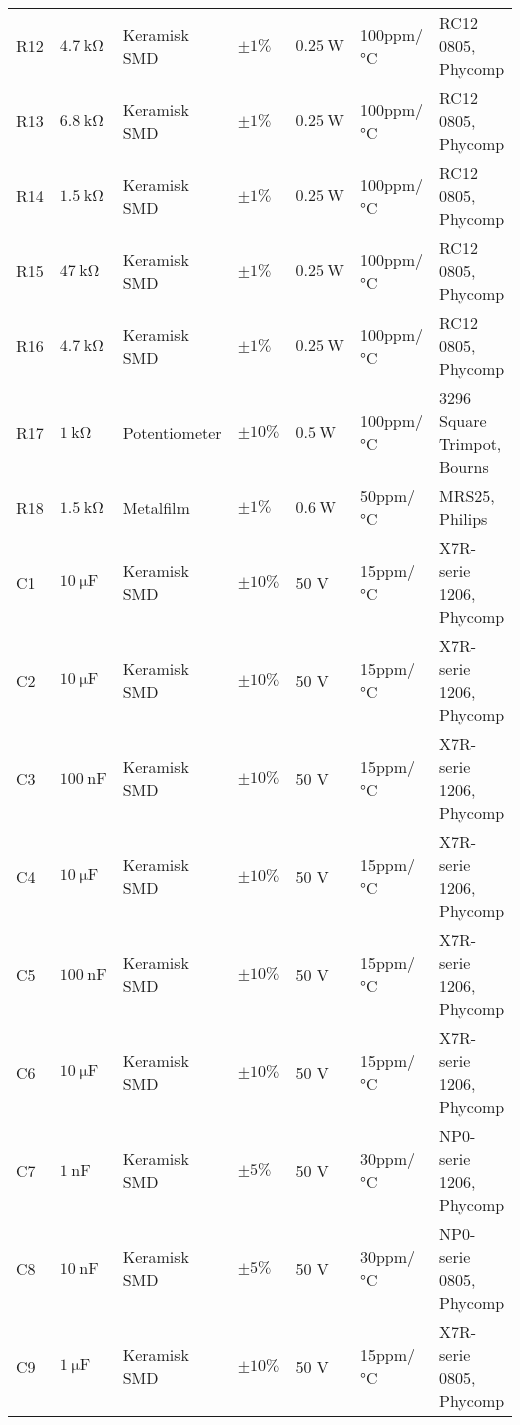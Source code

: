 \begin{table}[h!]
\begin{threeparttable}
\begin{tabular}{ l l l l l l l }
R12 & $\SI{4.7}{\kilo\ohm}$		& Keramisk	SMD	& $\pm 1\%$ 		 & $\SI{0.25}{\watt}$	  & 100ppm/\si{\celsius}  & RC12 0805, Phycomp \\
R13 & $\SI{6.8}{\kilo\ohm}$		& Keramisk	SMD	& $\pm 1\%$ 		 & $\SI{0.25}{\watt}$	  & 100ppm/\si{\celsius}  & RC12 0805, Phycomp \\
R14 & $\SI{1.5}{\kilo\ohm}$		& Keramisk	SMD	& $\pm 1\%$ 		 & $\SI{0.25}{\watt}$	  & 100ppm/\si{\celsius}  & RC12 0805, Phycomp \\
R15 & $\SI{47}{\kilo\ohm}$		& Keramisk	SMD	& $\pm 1\%$ 		 & $\SI{0.25}{\watt}$	  & 100ppm/\si{\celsius}  & RC12 0805, Phycomp \\
R16 & $\SI{4.7}{\kilo\ohm}$		& Keramisk	SMD	& $\pm 1\%$ 		 & $\SI{0.25}{\watt}$	  & 100ppm/\si{\celsius}  & RC12 0805, Phycomp \\
R17 & $\SI{1}{\kilo\ohm}$		& Potentiometer		& $\pm 10\%$ 		 & $\SI{0.5}{\watt}$	  & 100ppm/\si{\celsius}  & 3296 Square Trimpot, Bourns  \\
R18 & $\SI{1.5}{\kilo\ohm}$		& Metalfilm	& $\pm 1\%$ 		 & $\SI{0.6}{\watt}$	  & 50ppm/\si{\celsius}  & MRS25, Philips \\
C1 & $\SI{10}{\micro\farad}$ & Keramisk SMD & $\pm 10\%$ & 50 \si{\volt}  & 15ppm/\si{\celsius} & X7R-serie 1206, Phycomp \\
C2 & $\SI{10}{\micro\farad}$ & Keramisk SMD & $\pm 10\%$ & 50 \si{\volt} & 15ppm/\si{\celsius} & X7R-serie 1206, Phycomp \\
C3 & $\SI{100}{\nano\farad}$ & Keramisk SMD & $\pm 10\%$ & 50 \si{\volt} & 15ppm/\si{\celsius} & X7R-serie 1206, Phycomp \\
C4 & $\SI{10}{\micro\farad}$ & Keramisk SMD & $\pm 10\%$ & 50 \si{\volt} & 15ppm/\si{\celsius} & X7R-serie 1206, Phycomp \\
C5 & $\SI{100}{\nano\farad}$ & Keramisk SMD & $\pm 10\%$ & 50 \si{\volt} & 15ppm/\si{\celsius} & X7R-serie 1206, Phycomp \\
C6 & $\SI{10}{\micro\farad}$ & Keramisk SMD & $\pm 10\%$ & 50 \si{\volt} & 15ppm/\si{\celsius} & X7R-serie 1206, Phycomp \\
C7 & $\SI{1}{\nano\farad}$ & Keramisk SMD & $\pm 5\%$ & 50 \si{\volt} & 30ppm/\si{\celsius} & NP0-serie 1206, Phycomp \\
C8 & $\SI{10}{\nano\farad}$ & Keramisk SMD & $\pm 5\%$ & 50 \si{\volt} & 30ppm/\si{\celsius} & NP0-serie 0805, Phycomp \\
C9 & $\SI{1}{\micro\farad}$ & Keramisk SMD & $\pm 10\%$ & 50 \si{\volt} & 15ppm/\si{\celsius} & X7R-serie 0805, Phycomp \\

\end{tabular}
\end{threeparttable}
\end{table}
